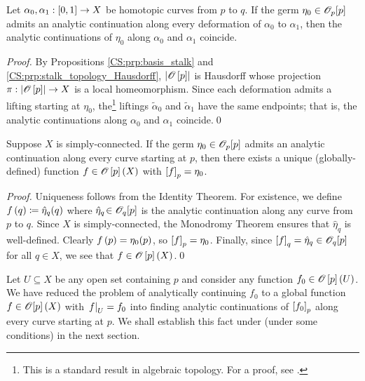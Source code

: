 \documentclass[../Moduli_Spaces_of_Riemann_Surfaces.tex]{subfiles}
\begin{document}
    \begin{corollary}
        Let $\alpha_0,\alpha_1:\left[0,1\right]\to X$ be homotopic curves from $p$ to $q$. If the germ $\eta_0\in\mathscr{O}_p\!\left[p\right]$ admits an analytic continuation along every deformation of $\alpha_0$ to $\alpha_1$, then the analytic continuations of $\eta_0$ along $\alpha_0$ and $\alpha_1$ coincide.
    \end{corollary}
    \begin{proof}
        By Propositions \ref{CS:prp:basis_stalk} and \ref{CS:prp:stalk_topology_Hausdorff}, $\left|\mathscr{O}\left[p\right]\right|$ is Hausdorff whose projection $\pi:\left|\mathscr{O}\left[p\right]\right|\to X$ is a local homeomorphism. Since each deformation admits a lifting starting at $\eta_0$, the\footnote{This is a standard result in algebraic topology. For a proof, see \cite[][Proposition 4.10]{forster}.} liftings $\tilde{\alpha}_0$ and $\tilde{\alpha}_1$ have the same endpoints; that is, the analytic continuations along $\alpha_0$ and $\alpha_1$ coincide.\qed
    \end{proof}
    \begin{corollary}\label{CS:thm:analytically_continue_to_global_function}
        Suppose $X$ is simply-connected. If the germ $\eta_0\in\mathscr{O}_p\!\left[p\right]$ admits an analytic continuation along every curve starting at $p$, then there exists a unique (globally-defined) function $f\in\mathscr{O}\left[p\right]\left(X\right)$ with $\left[f\right]_p=\eta_0$.
    \end{corollary}
    \begin{proof}
        Uniqueness follows from the Identity Theorem. For existence, we define $f\left(q\right)\coloneqq\hat{\eta}_q\!\left(q\right)$ where $\hat{\eta}_q\!\in\mathscr{O}_q\!\left[p\right]$ is the analytic continuation along any curve from $p$ to $q$. Since $X$ is simply-connected, the Monodromy Theorem ensures that $\hat{\eta}_q$ is well-defined. Clearly $f\left(p\right)=\eta_0\!\left(p\right)$, so $\left[f\right]_p=\eta_0$. Finally, since $\left[f\right]_q=\hat{\eta}_q\in\mathscr{O}_q\!\left[p\right]$ for all $q\in X$, we see that $f\in\mathscr{O}\left[p\right]\left(X\right)$.\qed
    \end{proof}
    \begin{remark}
        Let $U\subseteq X$ be any open set containing $p$ and consider any function $f_0\in\mathscr{O}\left[p\right]\left(U\right)$. We have reduced the problem of analytically continuing $f_0$ to a global function $f\in\mathscr{O}[p]\left(X\right)$ with $\left.f\right|_U=f_0$ into finding analytic continuations of $\left[f_0\right]_p$ along every curve starting at $p$. We shall establish this fact under (under some conditions) in the next section.\exqed
    \end{remark}
\end{document}
